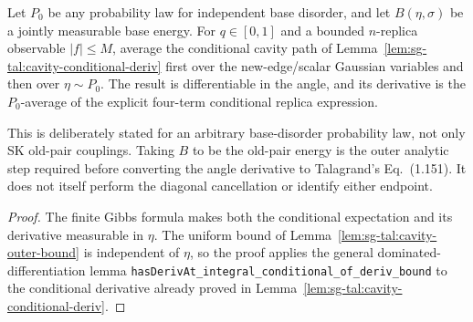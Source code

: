 \begin{lemma}
\label{lem:sg-tal:cavity-outer-derivative}
  \leanok
{}
Let $P_0$ be any probability law for independent base disorder, and let
$B(\eta,\sigma)$ be a jointly measurable base energy.  For $q\in[0,1]$ and
a bounded $n$-replica observable $|f|\le M$, average the conditional cavity
path of Lemma~\ref{lem:sg-tal:cavity-conditional-deriv} first over the
new-edge/scalar Gaussian variables and then over $\eta\sim P_0$.  The result
is differentiable in the angle, and its derivative is the $P_0$-average of
the explicit four-term conditional replica expression.

This is deliberately stated for an arbitrary base-disorder probability law,
not only SK old-pair couplings.  Taking $B$ to be the old-pair energy is the
outer analytic step required before converting the angle derivative to
Talagrand's Eq.~(1.151).  It does not itself perform the diagonal cancellation
or identify either endpoint.
\end{lemma}
\begin{proof}
  \leanok
The finite Gibbs formula makes both the conditional expectation and its
derivative measurable in $\eta$.  The uniform bound of Lemma~\ref{lem:sg-tal:cavity-outer-bound} is independent
of $\eta$, so the proof applies the general dominated-differentiation lemma
\texttt{hasDerivAt\_integral\_conditional\_of\_deriv\_bound} to the conditional
derivative already proved in Lemma~\ref{lem:sg-tal:cavity-conditional-deriv}.
\end{proof}

